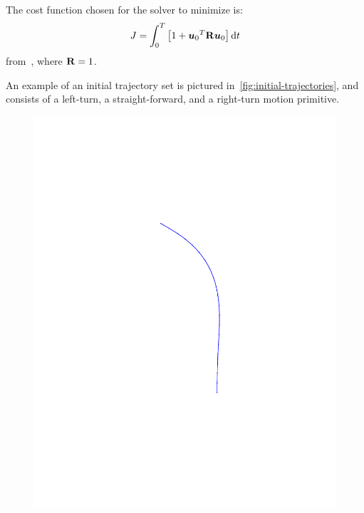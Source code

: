 The cost function chosen for the solver to minimize is:
\begin{equation}
  J = \int_{0}^{T} \left[ 1 + {\boldsymbol{u}_{0}}^{T} \mathbf{R} \boldsymbol{u}_{0} \right] \mathrm{d}t
\end{equation}
from~\cite{majumdarRobustOnlineMotion2013}, where \(\mathbf{R} = 1\).

An example of an initial trajectory set is pictured
in~\cref{fig:initial-trajectories}, and consists of a left-turn, a
straight-forward, and a right-turn motion primitive.

\begin{figure}
  \begin{minipage}[b]{0.3\textwidth}
    \includegraphics[trim={5cm 5cm 5cm 5cm},
    width=\textwidth]{figures/method/left-trajector}
  \end{minipage}
  \hfill
  \begin{minipage}[b]{0.3\textwidth}

\end{minipage}
\end{figure}
